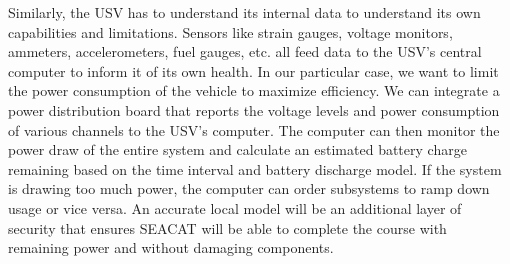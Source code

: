 Similarly, the USV has to understand its internal data to understand its own capabilities and limitations.
Sensors like strain gauges, voltage monitors, ammeters, accelerometers, fuel gauges, etc. all feed data to the USV's central computer to inform it of its own health.
In our particular case, we want to limit the power consumption of the vehicle to maximize efficiency.
We can integrate a power distribution board that reports the voltage levels and power consumption of various channels to the USV's computer.
The computer can then monitor the power draw of the entire system and calculate an estimated battery charge remaining based on the time interval and battery discharge model.
If the system is drawing too much power, the computer can order subsystems to ramp down usage or vice versa.
An accurate local model will be an additional layer of security that ensures SEACAT will be able to complete the course with remaining power and without damaging components.

